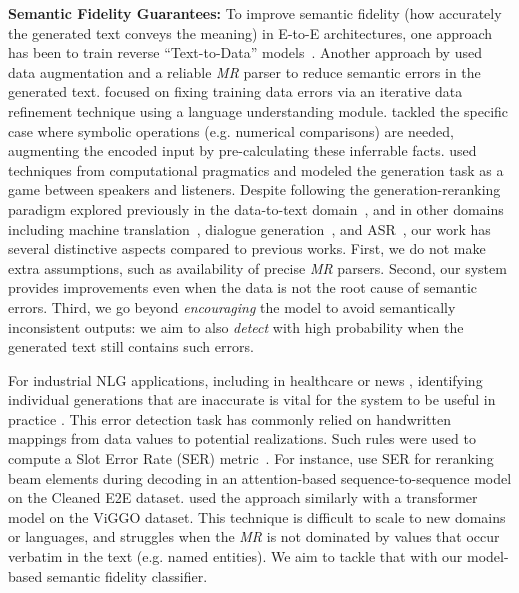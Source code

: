 \documentclass[11pt]{article}
\newcommand{\viggo}{ViGGO\xspace}
\newcommand{\cleanedee}{Cleaned E2E\xspace}
\newcommand{\mr}{\textit{MR}\xspace}
\theoremstyle{definition}
\theoremstyle{break}
\begin{document}
\noindent\textbf{Semantic Fidelity Guarantees:}
To improve semantic fidelity (how accurately the generated text conveys the meaning) in E-to-E architectures, one approach has been to train reverse ``Text-to-Data'' models~\cite{Chisholm2017,agarwal-etal-2018-char2char}. 
Another approach by  used data augmentation and a reliable \mr parser to reduce semantic errors in the generated text.  focused on fixing training data errors via an iterative data refinement technique using a language understanding module. 
 tackled the specific case where symbolic operations (e.g. numerical comparisons) are needed, augmenting the encoded input by pre-calculating these inferrable facts. 
 used techniques from computational pragmatics and modeled the generation task as a game between speakers and listeners.
Despite following the generation-reranking paradigm explored previously in the data-to-text domain~\cite{agarwal-etal-2018-char2char,moryossef2019improving,Dusek2019}, and in other domains including machine translation~\cite{shen2004discriminative}, dialogue generation~\cite{wen2015stochastic}, and ASR~\cite{morbini2012reranking}, our work has several distinctive aspects compared to previous works. First, we do not make extra assumptions, such as availability of precise \mr parsers. 
Second, our system provides improvements even when the data is not the root cause of semantic errors. Third, we go beyond \emph{encouraging} the model to avoid semantically inconsistent outputs: we aim to also \textit{detect} with high probability when the generated text still contains such errors. 

For industrial NLG applications, including in healthcare \cite{pauws2019making} or news \cite{leppanen2017data}, identifying individual generations that are inaccurate is vital for the system to be useful in practice \cite{smiley-etal-2017-say}.
This error detection task has commonly relied on handwritten mappings from data values to potential realizations. Such rules were used to compute a Slot Error Rate (SER) metric~\cite{Dusek2019,juraska2019viggo,moryossef2019improving}. For instance,  use SER for reranking beam elements during decoding in an attention-based sequence-to-sequence model on the \cleanedee dataset.  used the approach similarly with a transformer model on the \viggo dataset. This technique is difficult to scale to new domains or languages, and struggles when the \mr is not dominated by values that occur verbatim in the text (e.g. named entities). 
We aim to tackle that with our model-based semantic fidelity classifier.
\end{document}
